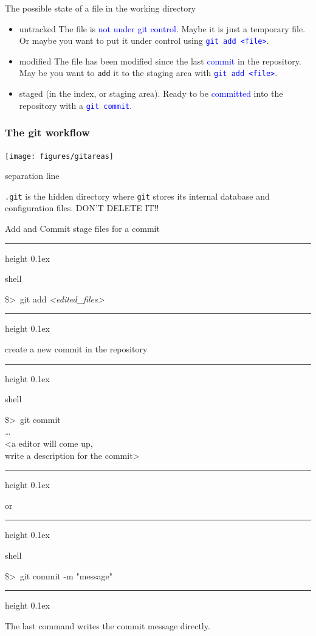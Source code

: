\documentclass[hyperref={colorlinks}]{beamer}
\newenvironment{shell}{%
\footnotesize\flushleft\hrule height 0.1ex
\tt\begin{beamercolorbox}[sep=1ex,left]{shell}%
}{%
\end{beamercolorbox}
\hrule height 0.1ex
\endflushleft\par
}
\newcommand*{\psone}[1][ant]{\$>~}
\newcommand*{\var}[1]{{\it<#1>}}
\newcommand{\titleline}[1][0.025cm]{%
\begin{beamercolorbox}[wd=\paperwidth,ht=#1,center]{separation line}%
\end{beamercolorbox}%
}
\begin{document}
\begin{frame}{The possible state of a file in the working directory}
\begin{itemize}
\item \alert{untracked} The file is \textcolor{blue}{not under git control}. Maybe it is just a temporary file. Or maybe you want to put it under control using \textcolor{blue}{\texttt{git add <file>}}.

\item \alert{modified} The file has been modified since the last \textcolor{blue}{commit} in the repository. May be you want to \texttt{add} it to the staging area with \textcolor{blue}{\texttt{git add <file>}}.

\item \alert{staged} (in the index, or staging area). Ready to be \textcolor{blue}{committed} into the repository with a \textcolor{blue}{\texttt{git commit}}.
\end{itemize}
\end{frame}
\begin{frame}
  \frametitle{The git workflow}
  \centerline{\texttt{[image: figures/gitareas]}}
  \titleline
  
  \alert{\texttt{.git}} is the \alert{hidden directory} where \texttt{git} stores its internal database and configuration files. \alert{DON'T DELETE IT!!}
\end{frame}

\begin{frame}{Add and Commit}
stage files for a commit
\begin{shell}
\psone git add \var{edited_files}
\end{shell}
create a new commit in the repository
\begin{shell}
\psone git commit \\
\ldots \\
<a editor will come up,\\ write a description for the commit>
\end{shell}
or
\begin{shell}
\psone git commit -m "message"\\
\end{shell}
The last command writes the commit message directly.
\end{frame}
\end{document}
